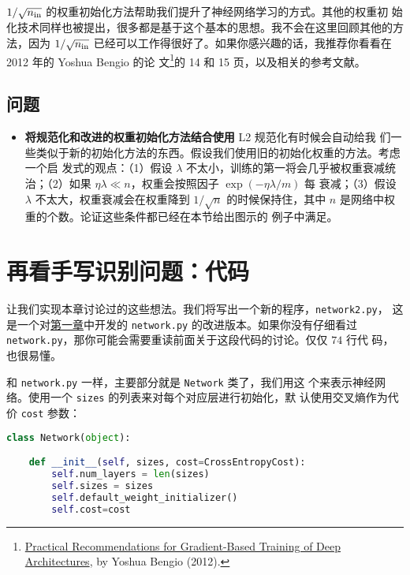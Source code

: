 $1/\sqrt{n_{\rm in}}$ 的权重初始化方法帮助我们提升了神经网络学习的方式。其他的权重初
始化技术同样也被提出，很多都是基于这个基本的思想。我不会在这里回顾其他的方法，因为
$1/\sqrt{n_{\rm in}}$ 已经可以工作得很好了。如果你感兴趣的话，我推荐你看看在
2012 年的 Yoshua Bengio 的论
文\footnote{\href{http://arxiv.org/pdf/1206.5533v2.pdf}{Practical
    Recommendations for Gradient-Based Training of Deep Architectures}, by
  Yoshua Bengio (2012).  }的 14 和 15 页，以及相关的参考文献。

\subsection*{问题}

\begin{itemize}
\item \textbf{将规范化和改进的权重初始化方法结合使用} L2 规范化有时候会自动给我
  们一些类似于新的初始化方法的东西。假设我们使用旧的初始化权重的方法。考虑一个启
  发式的观点：（1）假设 $\lambda$ 不太小，训练的第一\epochs{}将会几乎被权重衰减统
  治；（2）如果 $\eta \lambda \ll n$，权重会按照因子 $\exp(-\eta \lambda / m)$ 每
  \epochs{}衰减；（3）假设 $\lambda$ 不太大，权重衰减会在权重降到 $1/\sqrt{n}$
  的时候保持住，其中 $n$ 是网络中权重的个数。论证这些条件都已经在本节给出图示的
  例子中满足。
\end{itemize}

\section{再看手写识别问题：代码}
\label{sec:handwriting_recognition_revisited_the_code}

让我们实现本章讨论过的这些想法。我们将写出一个新的程序，\lstinline!network2.py!，
这是一个对\hyperref[sec:implementing_our_network_to_classify_digits]{第一章}中开发的 \lstinline!network.py! 的改进版本。如果你没有仔细看过
\lstinline!network.py!，那你可能会需要重读前面关于这段代码的讨论。仅仅 $74$ 行代
码，也很易懂。

和 \lstinline!network.py! 一样，主要部分就是 \lstinline!Network! 类了，我们用这
个来表示神经网络。使用一个 \lstinline!sizes! 的列表来对每个对应层进行初始化，默
认使用交叉熵作为代价 \lstinline!cost! 参数：
\begin{lstlisting}[language=Python]
class Network(object):

    def __init__(self, sizes, cost=CrossEntropyCost):
        self.num_layers = len(sizes)
        self.sizes = sizes
        self.default_weight_initializer()
        self.cost=cost
\end{lstlisting}

